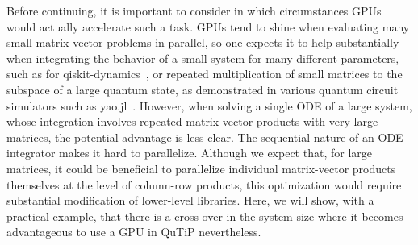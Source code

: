 \documentclass[preprint,3p,sort&compress]{elsarticle}
\begin{document}

Before continuing, it is important to consider in which circumstances GPUs would actually accelerate such a task. GPUs tend to shine when evaluating many small matrix-vector problems in parallel, so one expects it to help substantially when integrating the behavior of a small system for many different parameters, such as for qiskit-dynamics~\cite{2024qiskit}, or repeated multiplication of small matrices to the subspace of a large quantum state, as demonstrated in various quantum circuit simulators such as yao.jl~\cite{YaoFramework2019}. However, when solving a single ODE of a large system, whose integration involves repeated matrix-vector products with very large matrices, the potential advantage is less clear. The sequential nature of an ODE integrator makes it hard to parallelize. Although we expect that, for large matrices, it could be beneficial to parallelize individual matrix-vector products themselves at the level of column-row products, this optimization would require substantial modification of lower-level libraries. Here, we will show, with a practical example, that there is a cross-over in the system size where it becomes advantageous to use a GPU in QuTiP nevertheless.
\end{document}
